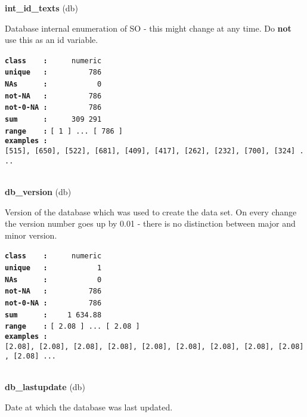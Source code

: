 \documentclass[]{article}
\begin{document}
\textbf{int\_id\_texts} (db)

Database internal enumeration of SO - this might change at any time. Do
\textbf{not} use this as an id variable.

\textbf{\texttt{class\ \ \ \ :}} \texttt{~~~~~numeric}\\
\textbf{\texttt{unique\ \ \ :}} \texttt{~~~~~~~~~786}\\
\textbf{\texttt{NAs\ \ \ \ \ \ :}} \texttt{~~~~~~~~~~~0}\\
\textbf{\texttt{not-NA\ \ \ :}} \texttt{~~~~~~~~~786}\\
\textbf{\texttt{not-0-NA\ :}} \texttt{~~~~~~~~~786}\\
\textbf{\texttt{sum\ \ \ \ \ \ :}} \texttt{~~~~~309~291}\\
\textbf{\texttt{range\ \ \ \ :}}
\texttt{{[}\ 1\ {]}\ ...\ {[}\ 786\ {]}}\\
\textbf{\texttt{examples\ :}}
\texttt{{[}515{]},\ {[}650{]},\ {[}522{]},\ {[}681{]},\ {[}409{]},\ {[}417{]},\ {[}262{]},\ {[}232{]},\ {[}700{]},\ {[}324{]}\ ...}\\

~

\textbf{db\_version} (db)

Version of the database which was used to create the data set. On every
change the version number goes up by 0.01 - there is no distinction
between major and minor version.

\textbf{\texttt{class\ \ \ \ :}} \texttt{~~~~~numeric}\\
\textbf{\texttt{unique\ \ \ :}} \texttt{~~~~~~~~~~~1}\\
\textbf{\texttt{NAs\ \ \ \ \ \ :}} \texttt{~~~~~~~~~~~0}\\
\textbf{\texttt{not-NA\ \ \ :}} \texttt{~~~~~~~~~786}\\
\textbf{\texttt{not-0-NA\ :}} \texttt{~~~~~~~~~786}\\
\textbf{\texttt{sum\ \ \ \ \ \ :}} \texttt{~~~~1~634.88}\\
\textbf{\texttt{range\ \ \ \ :}}
\texttt{{[}\ 2.08\ {]}\ ...\ {[}\ 2.08\ {]}}\\
\textbf{\texttt{examples\ :}}
\texttt{{[}2.08{]},\ {[}2.08{]},\ {[}2.08{]},\ {[}2.08{]},\ {[}2.08{]},\ {[}2.08{]},\ {[}2.08{]},\ {[}2.08{]},\ {[}2.08{]},\ {[}2.08{]}\ ...}\\

~

\textbf{db\_lastupdate} (db)

Date at which the database was last updated.
\end{document}
